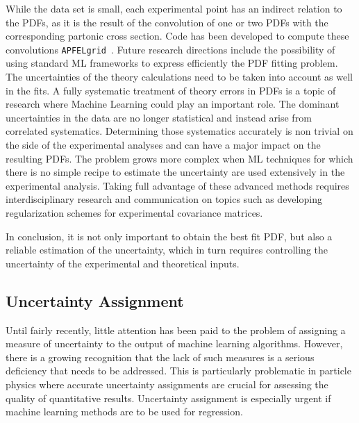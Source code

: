 While the data set is small, each experimental point has an indirect relation to the PDFs, as it is the result of the convolution of one or two PDFs with the corresponding partonic cross section. Code has been developed to compute these convolutions \texttt{APFELgrid}~\cite{Bertone:2016lga}. Future research directions include the possibility of using standard ML frameworks to express efficiently the PDF fitting problem.
The uncertainties of the theory calculations need to be taken into account as well in the fits. A fully systematic treatment of theory errors in PDFs is a topic of research where Machine Learning could play an important role.  The dominant uncertainties in the data are no longer statistical and instead arise from correlated systematics. Determining those systematics accurately is non trivial on the side of the experimental analyses and can have a major impact on the
resulting PDFs. The problem grows more complex when ML techniques for which there is no simple recipe to estimate the uncertainty are used extensively in the experimental analysis. Taking full advantage of these advanced methods requires interdisciplinary research and communication on topics such as developing regularization schemes for experimental covariance matrices.

In conclusion, it is not only important to obtain the best fit PDF, but also a reliable estimation of the uncertainty, which in turn requires controlling the uncertainty of the experimental and theoretical inputs.



\subsection{Uncertainty Assignment}
\label{sec:uncertainty}
Until fairly recently, little attention has been paid to the problem of assigning a measure of uncertainty to the output of machine learning algorithms. However, there is a growing recognition that the lack of such measures is a serious deficiency that needs to be addressed. This is particularly problematic in particle physics where accurate uncertainty assignments are crucial for assessing the quality of quantitative results. Uncertainty assignment is especially  urgent if machine learning methods are to be used for regression.

